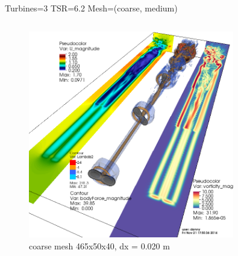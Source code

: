 \documentclass[xcolor=x11names,compress]{beamer}
\renewcommand{\(}{\begin{columns}}
\renewcommand{\)}{\end{columns}}
\newcommand{\<}[1]{\begin{column}{#1}}
\renewcommand{\>}{\end{column}}
\begin{document}
	\begin{frame}{Turbines=3  TSR=6.2  Mesh=(coarse, medium)}
		
		\begin{columns}
		    
		    \begin{column}{0.6\textwidth}
		        \begin{figure}[p]
				    \centering
				    \includegraphics[width=0.8\textwidth]{figures/fastFlume-v5__Turbines=3_TSR=6p2_Layout=offset_Mesh=coarse_maxTime=10__0741.png}
				    \caption{\scriptsize{coarse mesh 465x50x40, dx = 0.020 m}}
				\end{figure}

		    \end{column}
		    

\end{columns}
\end{frame}
\end{document}
